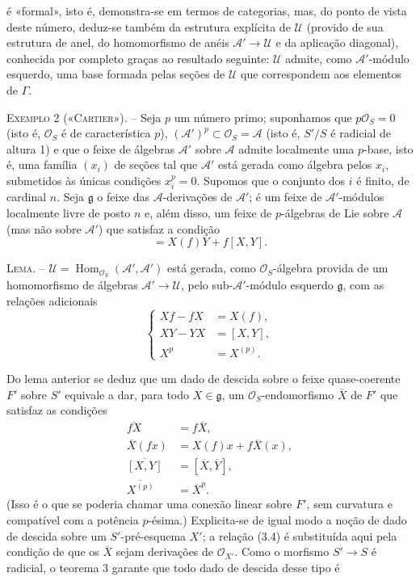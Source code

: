 \documentclass[11pt,twoside,openany]{book}
\numberwithin{equation}{section}
\newcommand{\src}[1]{%
  \phantomsection\hypertarget{src:#1}{}%
  \marginpar{\raggedleft\footnotesize\sffamily #1}%
}
\theoremstyle{plain}
\theoremstyle{definition}
\theoremstyle{remark}
\newcommand{\FgaUnitKey}{frontmatter}
\renewcommand{\src}[1]{%
  \phantomsection\hypertarget{src:\FgaUnitKey:#1}{}%
  \marginpar{\raggedleft\footnotesize\sffamily #1}%
}
\begin{document}
\src{321}
é «formal», isto é, demonstra-se em termos de categorias, mas, do
ponto de vista deste número, deduz-se também da estrutura explícita de
$\mathcal U$ (provido de sua estrutura de anel, do homomorfismo de anéis
$\mathcal A'\longrightarrow\mathcal U$ e da aplicação diagonal), conhecida
por completo graças ao resultado seguinte: $\mathcal U$ admite, como
$\mathcal A'$-módulo esquerdo, uma base formada pelas seções de
$\mathcal U$ que correspondem aos elementos de $\Gamma$.

\textsc{Exemplo 2 («Cartier»).} -- Seja $p$ um número primo; suponhamos que
$p\mathcal O_S=0$ (isto é, $\mathcal O_S$ é de característica $p$),
$(\mathcal A')^p\subset\mathcal O_S=\mathcal A$ (isto é, $S'/S$ é radicial
de altura 1) e que o feixe de álgebras $\mathcal A'$ sobre $\mathcal A$ admite
localmente uma $p$-base, isto é, uma família $(x_i)$ de seções tal que
$\mathcal A'$ está gerada como álgebra pelos $x_i$, submetidos às únicas
condições $x_i^p=0$. Supomos que o conjunto dos $i$ é finito, de
cardinal $n$. Seja $\mathfrak g$ o feixe das $\mathcal A$-derivações de
$\mathcal A'$; é um feixe de $\mathcal A'$-módulos localmente livre de posto
$n$ e, além disso, um feixe de $p$-álgebras de Lie sobre $\mathcal A$ (mas não sobre
$\mathcal A'$) que satisfaz a condição
\begin{equation}
  [X,fY]=X(f)Y+f[X,Y].
  \tag{3.5}
\end{equation}

\textsc{Lema.} -- $\mathcal U=
\operatorname{Hom}_{\mathcal O_S}(\mathcal A',\mathcal A')$ está gerada,
como $\mathcal O_S$-álgebra provida de um homomorfismo de álgebras
$\mathcal A'\longrightarrow\mathcal U$, pelo sub-$\mathcal A'$-módulo
esquerdo $\mathfrak g$, com as relações adicionais
\begin{equation}
  \left\{
  \begin{aligned}
    Xf-fX&=X(f),\\
    XY-YX&=[X,Y],\\
    X^p&=X^{(p)}.
  \end{aligned}
  \right.
  \tag{3.6}
\end{equation}

Do lema anterior se deduz que um dado de descida sobre o feixe
quase-coerente $F'$ sobre $S'$ equivale a dar, para todo $X\in\mathfrak g$, um
$\mathcal O_S$-endomorfismo $\overline X$ de $F'$ que satisfaz as condições
\begin{align}
  \overline{fX}&=f\overline X, \tag{3.7}\\
  \overline X(fx)&=X(f)x+f\overline X(x), \tag{3.8}\\
  \overline{[X,Y]}&=[\overline X,\overline Y], \tag{3.9}\\
  \overline{X^{(p)}}&=\overline X^p. \tag{3.10}
\end{align}
(Isso é o que se poderia chamar uma conexão linear sobre $F'$, sem curvatura
e compatível com a potência $p$-ésima.) Explicita-se de igual modo a noção
de dado de descida sobre um $S'$-pré-esquema $X'$; a relação (3.4) é
substituída aqui pela condição de que os $\overline X$ sejam derivações de
$\mathcal O_{X'}$. Como o morfismo $S'\longrightarrow S$ é radicial, o
teorema 3 garante que todo dado de descida desse tipo é
\end{document}
